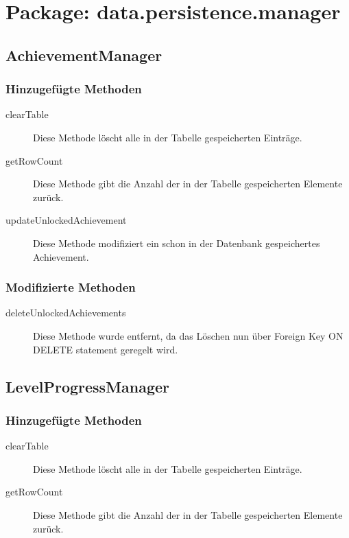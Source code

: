 \section{Package: data.persistence.manager}

\subsection{AchievementManager}

\subsubsection{Hinzugefügte Methoden}
\begin{description}
\item[clearTable]
Diese Methode löscht alle in der Tabelle gespeicherten Einträge.
\item[getRowCount]
Diese Methode gibt die Anzahl der in der Tabelle gespeicherten Elemente zurück.
\item[updateUnlockedAchievement]
Diese Methode modifiziert ein schon in der Datenbank gespeichertes Achievement.
\end{description}

\subsubsection{Modifizierte Methoden}
\begin{description}
\item[deleteUnlockedAchievements]
Diese Methode wurde entfernt, da das Löschen nun über Foreign Key ON DELETE statement geregelt wird.
\end{description}


\subsection{LevelProgressManager}

\subsubsection{Hinzugefügte Methoden}
\begin{description}
\item[clearTable]
Diese Methode löscht alle in der Tabelle gespeicherten Einträge.
\item[getRowCount]
Diese Methode gibt die Anzahl der in der Tabelle gespeicherten Elemente zurück.
\end{description}

